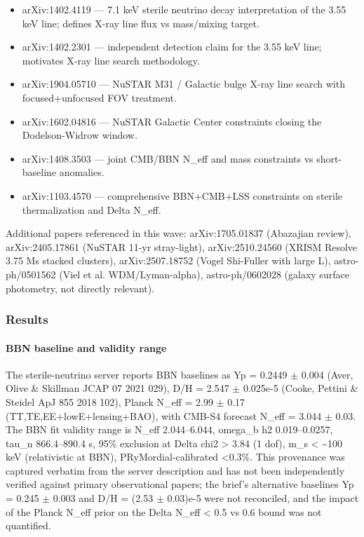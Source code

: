\documentclass[11pt,a4paper]{article}
\begin{document}
\begin{itemize}
  \item arXiv:1402.4119 --- 7.1 keV sterile neutrino decay interpretation of the 3.55 keV line; defines X-ray line flux vs mass/mixing target.
  \item arXiv:1402.2301 --- independent detection claim for the 3.55 keV line; motivates X-ray line search methodology.
  \item arXiv:1904.05710 --- NuSTAR M31 / Galactic bulge X-ray line search with focused+unfocused FOV treatment.
  \item arXiv:1602.04816 --- NuSTAR Galactic Center constraints closing the Dodelson-Widrow window.
  \item arXiv:1408.3503 --- joint CMB/BBN N\_eff and mass constraints vs short-baseline anomalies.
  \item arXiv:1103.4570 --- comprehensive BBN+CMB+LSS constraints on sterile thermalization and Delta N\_eff.
\end{itemize}
Additional papers referenced in this wave: arXiv:1705.01837 (Abazajian review), arXiv:2405.17861 (NuSTAR 11-yr stray-light), arXiv:2510.24560 (XRISM Resolve 3.75 Ms stacked clusters), arXiv:2507.18752 (Vogel Shi-Fuller with large L), astro-ph/0501562 (Viel et al. WDM/Lyman-alpha), astro-ph/0602028 (galaxy surface photometry, not directly relevant).

\subsubsection*{Results}
\paragraph{BBN baseline and validity range}
The sterile-neutrino server reports BBN baselines as Yp = 0.2449 $\pm$ 0.004 (Aver, Olive \& Skillman JCAP 07 2021 029), D/H = 2.547 $\pm$ 0.025e-5 (Cooke, Pettini \& Steidel ApJ 855 2018 102), Planck N\_eff = 2.99 $\pm$ 0.17 (TT,TE,EE+lowE+lensing+BAO), with CMB-S4 forecast N\_eff = 3.044 $\pm$ 0.03. The BBN fit validity range is N\_eff 2.044--6.044, omega\_b h2 0.019--0.0257, tau\_n 866.4--890.4 s, 95\% exclusion at Delta chi2 \textgreater{} 3.84 (1 dof), m\_s \textless{} \textasciitilde{}100 keV (relativistic at BBN), PRyMordial-calibrated \textless{}0.3\%. This provenance was captured verbatim from the server description and has not been independently verified against primary observational papers; the brief's alternative baselines Yp = 0.245 $\pm$ 0.003 and D/H = (2.53 $\pm$ 0.03)e-5 were not reconciled, and the impact of the Planck N\_eff prior on the Delta N\_eff \textless{} 0.5 vs 0.6 bound was not quantified.
\end{document}

